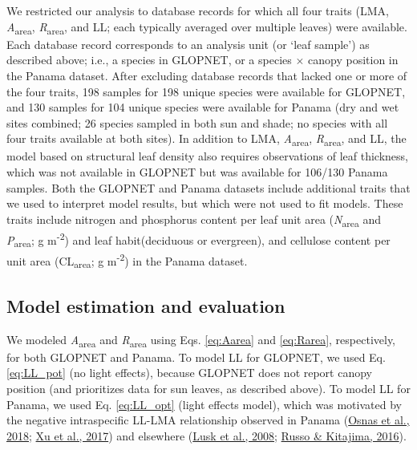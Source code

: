 \documentclass[
  12pt,
  a4paper,
,tablecaptionabove
]{scrartcl}
\begin{document}
We restricted our analysis to database records for which all four traits
(LMA, \emph{A}\textsubscript{area}, \emph{R}\textsubscript{area}, and
LL; each typically averaged over multiple leaves) were available. Each
database record corresponds to an analysis unit (or `leaf sample') as
described above; i.e., a species in GLOPNET, or a species \(\times\)
canopy position in the Panama dataset. After excluding database records
that lacked one or more of the four traits, 198 samples for 198 unique
species were available for GLOPNET, and 130 samples for 104 unique
species were available for Panama (dry and wet sites combined; 26
species sampled in both sun and shade; no species with all four traits
available at both sites). In addition to LMA,
\emph{A}\textsubscript{area}, \emph{R}\textsubscript{area}, and LL, the
model based on structural leaf density also requires observations of
leaf thickness, which was not available in GLOPNET but was available for
106/130 Panama samples. Both the GLOPNET and Panama datasets include
additional traits that we used to interpret model results, but which
were not used to fit models. These traits include nitrogen and
phosphorus content per leaf unit area (\emph{N}\textsubscript{area} and
\emph{P}\textsubscript{area}; g m\textsuperscript{-2}) and leaf
habit(deciduous or evergreen), and cellulose content per unit area
(CL\textsubscript{area}; g m\textsuperscript{-2}) in the Panama dataset.

\hypertarget{model-estimation-and-evaluation}{%
\subsection{Model estimation and
evaluation}\label{model-estimation-and-evaluation}}

We modeled \emph{A}\textsubscript{area} and \emph{R}\textsubscript{area}
using Eqs. \ref{eq:Aarea} and \ref{eq:Rarea}, respectively, for both
GLOPNET and Panama. To model LL for GLOPNET, we used Eq. \ref{eq:LL_pot}
(no light effects), because GLOPNET does not report canopy position (and
prioritizes data for sun leaves, as described above). To model LL for
Panama, we used Eq. \ref{eq:LL_opt} (light effects model), which was
motivated by the negative intraspecific LL-LMA relationship observed in
Panama (\protect\hyperlink{ref-Osnas2018}{Osnas et al., 2018};
\protect\hyperlink{ref-Xu2017}{Xu et al., 2017}) and elsewhere
(\protect\hyperlink{ref-Lusk2008}{Lusk et al., 2008};
\protect\hyperlink{ref-Russo2016}{Russo \& Kitajima, 2016}).
\end{document}
